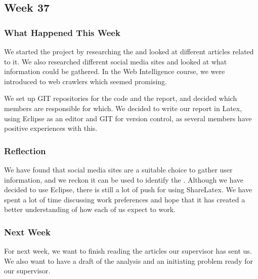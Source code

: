 \subsection{Week 37}
\subsubsection{What Happened This Week}
We started the project by researching the \textit{\fb}and looked at different
articles related to it. We also researched different social media sites and
looked at what information could be gathered. In the Web Intelligence
course, we were introduced to web crawlers which seemed promising.\nl

We set up GIT repositories for the code and the report, and decided which
members are responsible for which. We decided to write our report in Latex,
using Eclipse as an editor and GIT for version control, as several members have
positive experiences with this.

\subsubsection{Reflection}
We have found that social media sites are a suitable choice to gather user
information, and we reckon it can be used to identify the \fbp. Although we have
decided to use Eclipse, there is still a lot of push for using ShareLatex.
We have spent a lot of time discussing work preferences and hope that it has
created a better understanding of how each of us expect to work.

\subsubsection{Next Week}
For next week, we want to finish reading the articles our supervisor has sent
us.
We also want to have a draft of the analysis and an initiating problem ready for our
supervisor.
